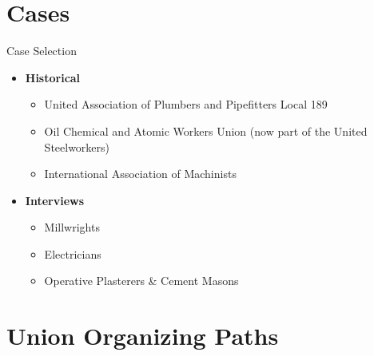 \documentclass{beamer}
\begin{document}
\section{Cases}
\begin{frame}{Case Selection}
	\begin{itemize}
		\item \textbf{Historical}
		\begin{itemize}
			\item United Association of Plumbers and Pipefitters Local 189
			\item Oil Chemical and Atomic Workers Union (now part of the United Steelworkers)
			\item International Association of Machinists
		\end{itemize}
		\item \textbf{Interviews}
		\begin{itemize}
			\item Millwrights
			\item Electricians
			\item Operative Plasterers \& Cement Masons
		\end{itemize}
	\end{itemize}
\end{frame}

\section{Union Organizing Paths}
%    
%    
%
\end{document}
